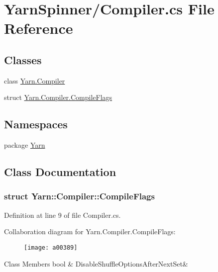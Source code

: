 \hypertarget{a00304}{\section{Yarn\-Spinner/\-Compiler.cs File Reference}
\label{a00304}
}
\subsection*{Classes}
\begin{DoxyCompactItemize}
\item 
class \hyperlink{a00054}{Yarn.\-Compiler}
\item 
struct \hyperlink{a00054_a00375}{Yarn.\-Compiler.\-Compile\-Flags}
\end{DoxyCompactItemize}
\subsection*{Namespaces}
\begin{DoxyCompactItemize}
\item 
package \hyperlink{a00051}{Yarn}
\end{DoxyCompactItemize}


\subsection{Class Documentation}
\label{a00375}
\hypertarget{a00054_a00375}{}
\subsubsection{struct Yarn\-:\-:Compiler\-:\-:Compile\-Flags}


Definition at line 9 of file Compiler.\-cs.



Collaboration diagram for Yarn.\-Compiler.\-Compile\-Flags\-:
\nopagebreak
\begin{figure}[H]
\begin{center}
\leavevmode
\texttt{[image: a00389]}
\end{center}
\end{figure}
\begin{DoxyFields}{Class Members}
\hypertarget{a00054_a8b49bb7763ff477cba21d7c771ef3ed0}{bool}\label{a00054_a8b49bb7763ff477cba21d7c771ef3ed0}
&
Disable\-Shuffle\-Options\-After\-Next\-Set&
\\
\hline

\end{DoxyFields}
